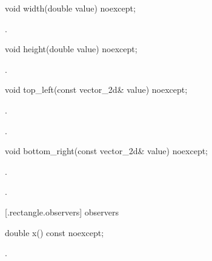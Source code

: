 \begin{itemdecl}
void width(double value) noexcept;
\end{itemdecl}
\begin{itemdescr}
	\pnum
	\postconditions
	.

\end{itemdescr}

\begin{itemdecl}
void height(double value) noexcept;
\end{itemdecl}
\begin{itemdescr}
	\pnum
	\postconditions
	.

\end{itemdescr}

\begin{itemdecl}
void top_left(const vector_2d& value) noexcept;
\end{itemdecl}
\begin{itemdescr}
	\pnum
	\postconditions
	.
	
	\pnum
	.
	
\end{itemdescr}

\begin{itemdecl}
void bottom_right(const vector_2d& value) noexcept;
\end{itemdecl}
\begin{itemdescr}
	\pnum
	\postconditions
	.
	
	\pnum
	.
	
\end{itemdescr}

 [\iotwod.rectangle.observers]{ observers}

\begin{itemdecl}
double x() const noexcept;
\end{itemdecl}
\begin{itemdescr}
	\pnum
	\returns
	.

\end{itemdescr}

